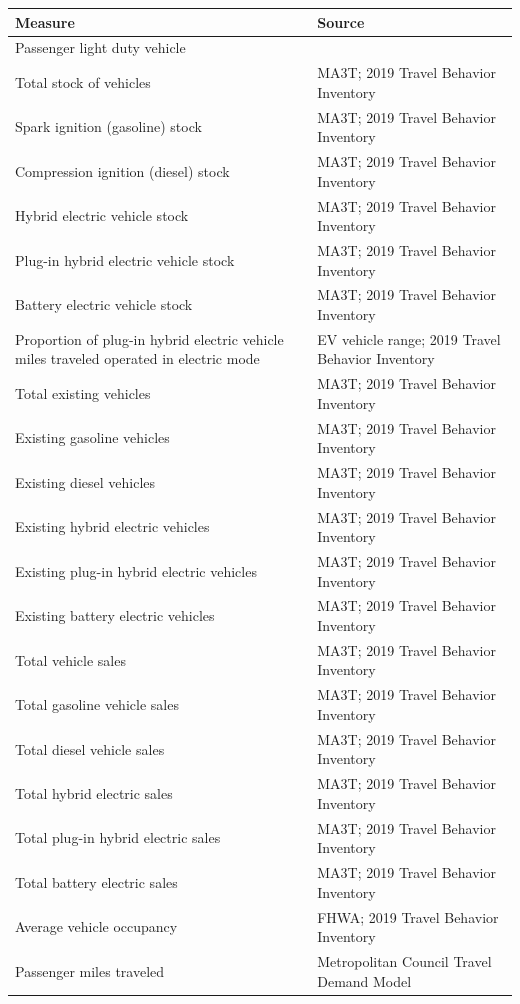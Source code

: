 \documentclass[
]{book}
\begin{document}
\begin{longtable}{ll}
\toprule
Measure & Source \\ 
\midrule
\multicolumn{2}{l}{Passenger light duty vehicle} \\ 
\midrule
Total stock of vehicles & MA3T; 2019 Travel Behavior Inventory \\ 
Spark ignition (gasoline) stock & MA3T; 2019 Travel Behavior Inventory \\ 
Compression ignition (diesel) stock & MA3T; 2019 Travel Behavior Inventory \\ 
Hybrid electric vehicle stock & MA3T; 2019 Travel Behavior Inventory \\ 
Plug-in hybrid electric vehicle stock & MA3T; 2019 Travel Behavior Inventory \\ 
Battery electric vehicle stock & MA3T; 2019 Travel Behavior Inventory \\ 
Proportion of plug-in hybrid electric vehicle miles traveled operated in electric mode & EV vehicle range; 2019 Travel Behavior Inventory \\ 
Total existing vehicles & MA3T; 2019 Travel Behavior Inventory \\ 
Existing gasoline vehicles & MA3T; 2019 Travel Behavior Inventory \\ 
Existing diesel vehicles & MA3T; 2019 Travel Behavior Inventory \\ 
Existing hybrid electric vehicles & MA3T; 2019 Travel Behavior Inventory \\ 
Existing plug-in hybrid electric vehicles & MA3T; 2019 Travel Behavior Inventory \\ 
Existing battery electric vehicles & MA3T; 2019 Travel Behavior Inventory \\ 
Total vehicle sales & MA3T; 2019 Travel Behavior Inventory \\ 
Total gasoline vehicle sales & MA3T; 2019 Travel Behavior Inventory \\ 
Total diesel vehicle sales & MA3T; 2019 Travel Behavior Inventory \\ 
Total hybrid electric sales & MA3T; 2019 Travel Behavior Inventory \\ 
Total plug-in hybrid electric sales & MA3T; 2019 Travel Behavior Inventory \\ 
Total battery electric sales & MA3T; 2019 Travel Behavior Inventory \\ 
Average vehicle occupancy & FHWA; 2019 Travel Behavior Inventory \\ 
Passenger miles traveled & Metropolitan Council Travel Demand Model \\ 

\end{longtable}
\end{document}
